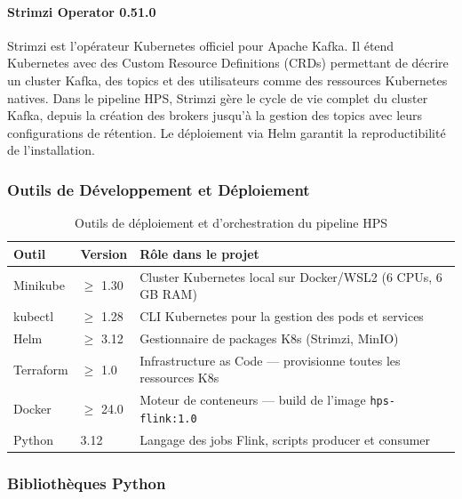 \vspace{0.3cm}
\paragraph{Strimzi Operator 0.51.0}
\vspace{0.3cm}
Strimzi est l'opérateur Kubernetes officiel pour Apache Kafka. Il étend Kubernetes avec des Custom Resource Definitions (CRDs) permettant de décrire un cluster Kafka, des topics et des utilisateurs comme des ressources Kubernetes natives. Dans le pipeline HPS, Strimzi gère le cycle de vie complet du cluster Kafka, depuis la création des brokers jusqu'à la gestion des topics avec leurs configurations de rétention. Le déploiement via Helm garantit la reproductibilité de l'installation.

\subsubsection{Outils de Développement et Déploiement}
\vspace{0.3cm}

\begin{table}[H]
\centering
\renewcommand{\arraystretch}{1.5}
\begin{tabular}{|l|l|p{8cm}|}
\hline
\textbf{Outil} & \textbf{Version} & \textbf{Rôle dans le projet} \\
\hline
Minikube     & $\geq$ 1.30   & Cluster Kubernetes local sur Docker/WSL2 (6 CPUs, 6 GB RAM) \\
kubectl      & $\geq$ 1.28   & CLI Kubernetes pour la gestion des pods et services \\
Helm         & $\geq$ 3.12   & Gestionnaire de packages K8s (Strimzi, MinIO) \\
Terraform    & $\geq$ 1.0    & Infrastructure as Code --- provisionne toutes les ressources K8s \\
Docker       & $\geq$ 24.0   & Moteur de conteneurs --- build de l'image \texttt{hps-flink:1.0} \\
Python       & 3.12          & Langage des jobs Flink, scripts producer et consumer \\
\hline
\end{tabular}
\caption{Outils de déploiement et d'orchestration du pipeline HPS}
\label{tab:outils}
\end{table}

\subsubsection{Bibliothèques Python}
\vspace{0.3cm}

